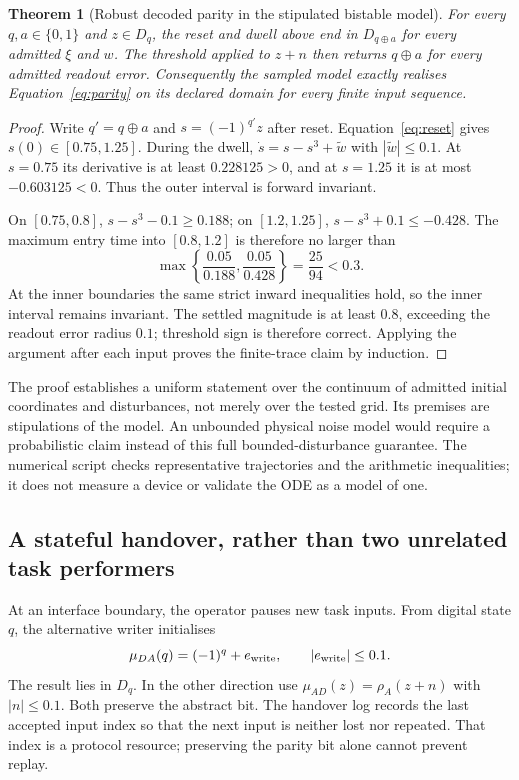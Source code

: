 \documentclass[11pt,a4paper]{article}
\newtheorem{theorem}{Theorem}[section]
\theoremstyle{definition}
\theoremstyle{remark}
\begin{document}
\begin{theorem}[Robust decoded parity in the stipulated bistable model]\label{thm:parity}
For every $q,a\in\{0,1\}$ and $z\in D_q$, the reset and dwell above end in $D_{q\oplus a}$ for every admitted $\xi$ and $w$. The threshold applied to $z+n$ then returns $q\oplus a$ for every admitted readout error. Consequently the sampled model exactly realises Equation~\eqref{eq:parity} on its declared domain for every finite input sequence.
\end{theorem}
\begin{proof}
Write $q'=q\oplus a$ and $s=(-1)^{q'}z$ after reset. Equation~\eqref{eq:reset} gives $s(0)\in[0.75,1.25]$. During the dwell,
$\dot s=s-s^3+\widetilde w$ with $|\widetilde w|\leq0.1$.
At $s=0.75$ its derivative is at least $0.228125>0$, and at $s=1.25$ it is at most $-0.603125<0$. Thus the outer interval is forward invariant.

On $[0.75,0.8]$, $s-s^3-0.1\geq0.188$; on $[1.2,1.25]$, $s-s^3+0.1\leq-0.428$. The maximum entry time into $[0.8,1.2]$ is therefore no larger than
\[
 \max\left\{\frac{0.05}{0.188},\frac{0.05}{0.428}\right\}
 =\frac{25}{94}<0.3.
\]
At the inner boundaries the same strict inward inequalities hold, so the inner interval remains invariant. The settled magnitude is at least $0.8$, exceeding the readout error radius $0.1$; threshold sign is therefore correct. Applying the argument after each input proves the finite-trace claim by induction.
\end{proof}
The proof establishes a uniform statement over the continuum of admitted initial coordinates and disturbances, not merely over the tested grid. Its premises are stipulations of the model. An unbounded physical noise model would require a probabilistic claim instead of this full bounded-disturbance guarantee. The numerical script checks representative trajectories and the arithmetic inequalities; it does not measure a device or validate the ODE as a model of one.

\subsection{A stateful handover, rather than two unrelated task performers}
At an interface boundary, the operator pauses new task inputs. From digital state $q$, the alternative writer initialises
\[
 \mu_{D A}(q)=(-1)^q+e_{\rm write},\qquad |e_{\rm write}|\leq0.1.
\]
The result lies in $D_q$. In the other direction use
$\mu_{A D}(z)=\rho_A(z+n)$ with $|n|\leq0.1$. Both preserve the abstract bit. The handover log records the last accepted input index so that the next input is neither lost nor repeated. That index is a protocol resource; preserving the parity bit alone cannot prevent replay.
\end{document}
